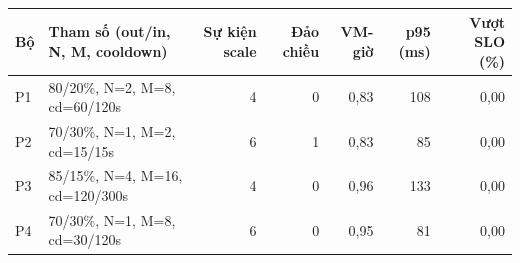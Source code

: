 \begin{tabular}{@{}llrrrrr@{}}
\toprule
Bộ & Tham số (out/in, N, M, cooldown) & Sự kiện scale & Đảo chiều & VM-giờ & p95 (ms) & Vượt SLO (\%) \\
\midrule
P1 & 80/20\%, N=2, M=8, cd=60/120s & 4 & 0 & 0,83 & 108 & 0,00 \\
P2 & 70/30\%, N=1, M=2, cd=15/15s & 6 & 1 & 0,83 & 85 & 0,00 \\
P3 & 85/15\%, N=4, M=16, cd=120/300s & 4 & 0 & 0,96 & 133 & 0,00 \\
P4 & 70/30\%, N=1, M=8, cd=30/120s & 6 & 0 & 0,95 & 81 & 0,00 \\
\bottomrule
\end{tabular}
